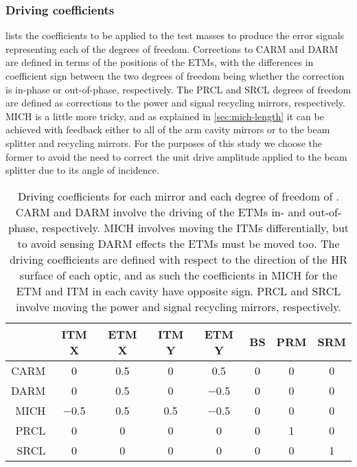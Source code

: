 \subsubsection{Driving coefficients}
 lists the coefficients to be applied to the test masses to produce the error signals representing each of the degrees of freedom. Corrections to \gls{CARM} and \gls{DARM} are defined in terms of the positions of the \glspl{ETM}, with the differences in coefficient sign between the two degrees of freedom being whether the correction is in-phase or out-of-phase, respectively. The \gls{PRCL} and \gls{SRCL} degrees of freedom are defined as corrections to the power and signal recycling mirrors, respectively. \gls{MICH} is a little more tricky, and as explained in \cref{sec:mich-length} it can be achieved with feedback either to all of the arm cavity mirrors or to the beam splitter and recycling mirrors. For the purposes of this study we choose the former to avoid the need to correct the unit drive amplitude applied to the beam splitter due to its angle of incidence.

\begin{table}
  \centering
  \begin{tabular}{r|ccccccc}
    & \textbf{\gls{ITM} X} & \textbf{\gls{ETM} X} & \textbf{\gls{ITM} Y} & \textbf{\gls{ETM} Y} & \textbf{\gls{BS}} & \textbf{\gls{PRM}} & \textbf{\gls{SRM}} \\
    \hline
    \gls{CARM} & \num{0} & \num{0.5} & \num{0} & \num{0.5} & \num{0} & \num{0} & \num{0} \\
    \gls{DARM} & \num{0} & \num{0.5} & \num{0} & \num{-0.5} & \num{0} & \num{0} & \num{0} \\
    \gls{MICH} & \num{-0.5} & \num{0.5} & \num{0.5} & \num{-0.5} & \num{0} & \num{0} & \num{0} \\
    \gls{PRCL} & \num{0} & \num{0} & \num{0} & \num{0} & \num{0} & \num{1} & \num{0} \\
    \gls{SRCL} & \num{0} & \num{0} & \num{0} & \num{0} & \num{0} & \num{0} & \num{1} \\
  \end{tabular}
  \caption[Driving coefficients for each mirror and each degree of freedom of \ETLF{}]{\label{tab:et-lf-driving-coefficients}Driving coefficients for each mirror and each degree of freedom of \ETLF{}. \gls{CARM} and \gls{DARM} involve the driving of the \glspl{ETM} in- and out-of-phase, respectively. \gls{MICH} involves moving the \glspl{ITM} differentially, but to avoid sensing \gls{DARM} effects the \glspl{ETM} must be moved too. The driving coefficients are defined with respect to the direction of the \gls{HR} surface of each optic, and as such the coefficients in \gls{MICH} for the \gls{ETM} and \gls{ITM} in each cavity have opposite sign. \gls{PRCL} and \gls{SRCL} involve moving the power and signal recycling mirrors, respectively.}
\end{table}

